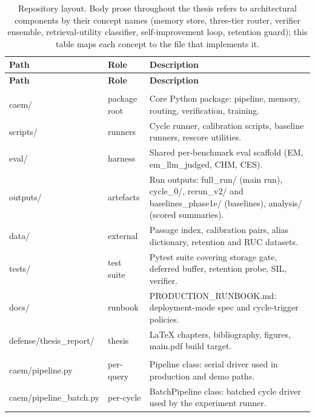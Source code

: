 {\scriptsize
\setlength{\tabcolsep}{4pt}
\renewcommand{\arraystretch}{1.15}
\begin{longtable}{@{}>{\ttfamily}p{5.8cm}p{2.2cm}p{6.6cm}@{}}
\caption[Repository layout]{Repository layout. Body prose throughout the thesis refers to architectural components by their concept names (memory store, three-tier router, verifier ensemble, retrieval-utility classifier, self-improvement loop, retention guard); this table maps each concept to the file that implements it.}
\label{tab:app-repo-layout}\\
\toprule
\textnormal{\textbf{Path}} & \textbf{Role} & \textbf{Description} \\
\midrule
\endfirsthead
\toprule
\textnormal{\textbf{Path}} & \textbf{Role} & \textbf{Description} \\
\midrule
\endhead
\bottomrule
\endfoot
\multicolumn{3}{@{}l}{\textnormal{\textit{Top-level directories}}} \\
caem/              & package root & Core Python package: pipeline, memory, routing, verification, training. \\
scripts/           & runners      & Cycle runner, calibration scripts, baseline runners, rescore utilities. \\
eval/              & harness      & Shared per-benchmark eval scaffold (EM, em\_llm\_judged, CHM, CES). \\
outputs/           & artefacts    & Run outputs: full\_run/ (main run), cycle\_0/, rerun\_v2/ and baselines\_phase1e/ (baselines), analysis/ (scored summaries). \\
data/              & external     & Passage index, calibration pairs, alias dictionary, retention and RUC datasets. \\
tests/             & test suite   & Pytest suite covering storage gate, deferred buffer, retention probe, SIL, verifier. \\
docs/              & runbook      & PRODUCTION\_RUNBOOK.md: deployment-mode spec and cycle-trigger policies. \\
defense/thesis\_report/ & thesis   & LaTeX chapters, bibliography, figures, main.pdf build target. \\
\midrule
\multicolumn{3}{@{}l}{\textnormal{\textit{Pipeline entry points}}} \\
caem/pipeline.py            & per-query  & Pipeline class: serial driver used in production and demo paths. \\
caem/pipeline\_batch.py     & per-cycle  & BatchPipeline class: batched cycle driver used by the experiment runner. \\

\end{longtable}}
